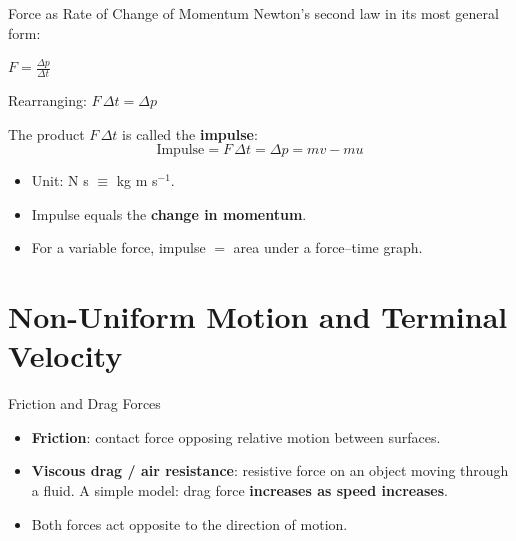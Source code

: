 \begin{formulabox}{Force as Rate of Change of Momentum}
Newton's second law in its most general form:
\begin{center}
\Large $F = \frac{\Delta p}{\Delta t}$
\end{center}
\vspace{0.2em}
Rearranging: $F\,\Delta t = \Delta p$

The product $F\,\Delta t$ is called the \textbf{impulse}:
$$\text{Impulse} = F\,\Delta t = \Delta p = mv - mu$$
\begin{itemize}[itemsep=2pt]
  \item Unit: N s $\equiv$ kg m s$^{-1}$.
  \item Impulse equals the \textbf{change in momentum}.
  \item For a variable force, impulse $=$ area under a force--time graph.
\end{itemize}
\end{formulabox}

\begin{center}
\end{center}

\section{Non-Uniform Motion and Terminal Velocity}

\begin{definitionbox}{Friction and Drag Forces}
\begin{itemize}[itemsep=2pt]
  \item \textbf{Friction}: contact force opposing relative motion between surfaces.
  \item \textbf{Viscous drag / air resistance}: resistive force on an object moving through a fluid. A simple model: drag force \textbf{increases as speed increases}.
  \item Both forces act opposite to the direction of motion.
\end{itemize}
\end{definitionbox}

